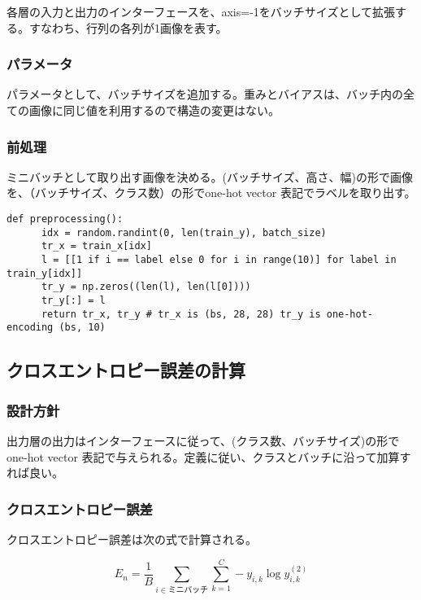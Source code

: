 \documentclass[platex,dvipdfmx]{jsarticle}
\begin{document}
  各層の入力と出力のインターフェースを、axis=-1をバッチサイズとして拡張する。すなわち、行列の各列が1画像を表す。

  \subsubsection{パラメータ}

  パラメータとして、バッチサイズを追加する。重みとバイアスは、バッチ内の全ての画像に同じ値を利用するので構造の変更はない。

  \subsubsection{前処理}

  ミニバッチとして取り出す画像を決める。(バッチサイズ、高さ、幅)の形で画像を、（バッチサイズ、クラス数）の形でone-hot vector 表記でラベルを取り出す。

  \begin{lstlisting}[caption=ex2.py, label=preprocessing]
    def preprocessing():
      idx = random.randint(0, len(train_y), batch_size)
      tr_x = train_x[idx]
      l = [[1 if i == label else 0 for i in range(10)] for label in train_y[idx]]
      tr_y = np.zeros((len(l), len(l[0])))
      tr_y[:] = l
      return tr_x, tr_y # tr_x is (bs, 28, 28) tr_y is one-hot-encoding (bs, 10)
  \end{lstlisting}

  \subsection{クロスエントロピー誤差の計算}

  \subsubsection{設計方針}
  
  出力層の出力はインターフェースに従って、(クラス数、バッチサイズ)の形でone-hot vector 表記で与えられる。定義に従い、クラスとバッチに沿って加算すれば良い。

  \subsubsection{クロスエントロピー誤差}

  クロスエントロピー誤差は次の式で計算される。

  \[
    E_n = \frac{1}{B} \sum_{i \in ミニバッチ} \sum_{k=1}^{C} -y_{i,k} \log y_{i,k}^{(2)}
  \]
\end{document}
